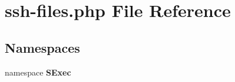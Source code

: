 \section{ssh-files.php File Reference}
\label{ssh-files_8php}
\subsection*{Namespaces}
\begin{CompactItemize}
\item 
namespace {\bf SExec}
\end{CompactItemize}
